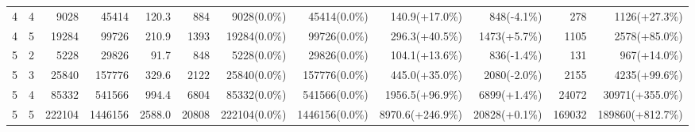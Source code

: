\documentclass{article}
\begin{document}
\begin{table}[t]
{\begin{tabular}{cc
                r r r r
                r r r r r r}
4 & 4 & 9028 & 45414 & 120.3 & 884 &
9028(0.0\%) & 45414(0.0\%) & 140.9(+17.0\%) & 848(-4.1\%) & 278 & 1126(+27.3\%) \\

4 & 5 & 19284 & 99726 & 210.9 & 1393 &
19284(0.0\%) & 99726(0.0\%) & 296.3(+40.5\%) & 1473(+5.7\%) & 1105 & 2578(+85.0\%) \\

5 & 2 & 5228 & 29826 & 91.7 & 848 &
5228(0.0\%) & 29826(0.0\%) & 104.1(+13.6\%) & 836(-1.4\%) & 131 & 967(+14.0\%) \\

5 & 3 & 25840 & 157776 & 329.6 & 2122 &
25840(0.0\%) & 157776(0.0\%) & 445.0(+35.0\%) & 2080(-2.0\%) & 2155 & 4235(+99.6\%) \\

5 & 4 & 85332 & 541566 & 994.4 & 6804 &
85332(0.0\%) & 541566(0.0\%) & 1956.5(+96.9\%) & 6899(+1.4\%) & 24072 & 30971(+355.0\%) \\

5 & 5 & 222104 & 1446156 & 2588.0 & 20808 &
222104(0.0\%) & 1446156(0.0\%) & 8970.6(+246.9\%) & 20828(+0.1\%) & 169032 & 189860(+812.7\%) \\

\bottomrule
\end{tabular}
}
\end{table}
\end{document}
